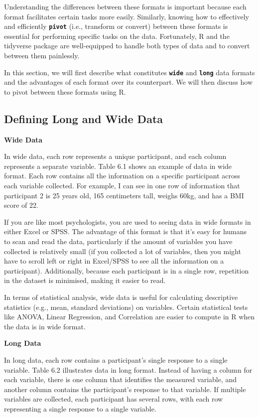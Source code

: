 \documentclass[
]{book}
\begin{document}
Understanding the differences between these formats is important because each format facilitates certain tasks more easily. Similarly, knowing how to effectively and efficiently \textbf{\texttt{pivot}} (i.e., transform or convert) between these formats is essential for performing specific tasks on the data. Fortunately, R and the tidyverse package are well-equipped to handle both types of data and to convert between them painlessly.

In this section, we will first describe what constitutes \textbf{\texttt{wide}} and \textbf{\texttt{long}} data formats and the advantages of each format over its counterpart. We will then discuss how to pivot between these formats using R.

\hypertarget{defining-long-and-wide-data}{%
\subsection{Defining Long and Wide Data}\label{defining-long-and-wide-data}}

\textbf{Wide Data}

In wide data, each row represents a unique participant, and each column represents a separate variable. Table 6.1 shows an example of data in wide format. Each row contains all the information on a specific participant across each variable collected. For example, I can see in one row of information that participant 2 is 25 years old, 165 centimeters tall, weighs 60kg, and has a BMI score of 22.

If you are like most psychologists, you are used to seeing data in wide formats in either Excel or SPSS. The advantage of this format is that it's easy for humans to scan and read the data, particularly if the amount of variables you have collected is relatively small (if you collected a lot of variables, then you might have to scroll left or right in Excel/SPSS to see all the information on a participant). Additionally, because each participant is in a single row, repetition in the dataset is minimised, making it easier to read.

In terms of statistical analysis, wide data is useful for calculating descriptive statistics (e.g., mean, standard deviations) on variables. Certain statistical tests like ANOVA, Linear Regression, and Correlation are easier to compute in R when the data is in wide format.

\textbf{Long Data}

In long data, each row contains a participant's single response to a single variable. Table 6.2 illustrates data in long format. Instead of having a column for each variable, there is one column that identifies the measured variable, and another column contains the participant's response to that variable. If multiple variables are collected, each participant has several rows, with each row representing a single response to a single variable.
\end{document}
